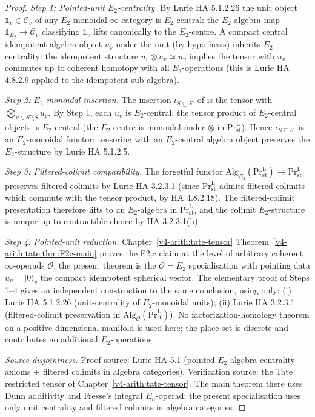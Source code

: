 \begin{proof}
\emph{Step 1: Pointed-unit \(E_{2}\)-centrality.} By Lurie HA 5.1.2.26
the unit object \(\mathbb{1}_{v}\in\mathcal{C}_{v}\) of any
\(E_{2}\)-monoidal \(\infty\)-category is \(E_{2}\)-central: the
\(E_{2}\)-algebra map \(\mathbb{1}_{E_{2}}\to\mathcal{C}_{v}\) classifying
\(\mathbb{1}_{v}\) lifts canonically to the \(E_{2}\)-centre. A compact
central idempotent algebra object \(u_{v}\) under the unit (by
hypothesis) inherits \(E_{2}\)-centrality: the idempotent structure
\(u_{v}\otimes u_{v}\simeq u_{v}\) implies the tensor with \(u_{v}\)
commutes up to coherent homotopy with all \(E_{2}\)-operations (this is
Lurie HA 4.8.2.9 applied to the idempotent sub-algebra).

\emph{Step 2: \(E_{2}\)-monoidal insertion.} The insertion
\(\iota_{S\subseteq S'}\) of
 is the tensor with
\(\bigotimes_{v\in S'\setminus S}u_{v}\). By Step 1, each \(u_{v}\) is
\(E_{2}\)-central; the tensor product of \(E_{2}\)-central objects is
\(E_{2}\)-central (the \(E_{2}\)-centre is monoidal under
\(\otimes\) in \(\mathrm{Pr}^{\mathrm{L}}_{\mathrm{st}}\)).
Hence \(\iota_{S\subseteq S'}\) is an
\(E_{2}\)-monoidal functor: tensoring with an \(E_{2}\)-central algebra
object preserves the \(E_{2}\)-structure by Lurie HA 5.1.2.5.

\emph{Step 3: Filtered-colimit compatibility.} The forgetful functor
\(\mathrm{Alg}_{E_{2}}(\mathrm{Pr}^{\mathrm{L}}_{\mathrm{st}})\to\mathrm{Pr}^{\mathrm{L}}_{\mathrm{st}}\)
preserves filtered colimits by Lurie HA 3.2.3.1 (since
\(\mathrm{Pr}^{\mathrm{L}}_{\mathrm{st}}\) admits filtered colimits
which commute with the tensor product, by HA 4.8.2.18). The
filtered-colimit presentation
 therefore lifts to an
\(E_{2}\)-algebra in \(\mathrm{Pr}^{\mathrm{L}}_{\mathrm{st}}\), and the
colimit \(E_{2}\)-structure is unique up to contractible choice by
HA 3.2.3.1(b).

\emph{Step 4: Pointed-unit reduction.}
Chapter~\ref{v4-arith:tate-tensor} Theorem~\ref{v4-arith:tate:thm:F2c-main}
proves the F2.c claim at the level of arbitrary
coherent \(\infty\)-operads \(\mathcal{O}\); the present theorem is the
\(\mathcal{O}=E_{2}\) specialisation with pointing data
\(u_{v}=|0\rangle_{v}\) the compact idempotent spherical vector. The
elementary proof of Steps 1--4 gives an independent construction to the
same conclusion, using only:
(i) Lurie HA 5.1.2.26 (unit-centrality of \(E_{2}\)-monoidal units);
(ii) Lurie HA 3.2.3.1 (filtered-colimit preservation in
\(\mathrm{Alg}_{\mathcal{O}}(\mathrm{Pr}^{\mathrm{L}}_{\mathrm{st}})\)).
No factorization-homology theorem on a positive-dimensional manifold is
used here; the place set is discrete and contributes no additional
\(E_{2}\)-operations.

\emph{Source disjointness.} Proof source: Lurie HA 5.1 (pointed
\(E_{2}\)-algebra centrality axioms + filtered colimits in algebra
categories). Verification source: the Tate restricted tensor of
Chapter~\ref{v4-arith:tate-tensor}. The main theorem there uses Dunn
additivity and Fresse's integral \(E_{n}\)-operad; the present
specialisation uses only unit centrality and filtered colimits in
algebra categories.
\end{proof}

